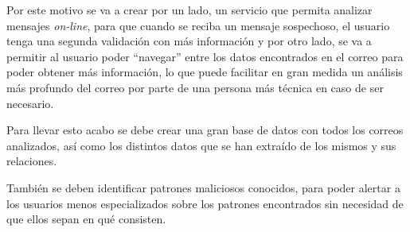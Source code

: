 Por este motivo se va a crear por un lado, un servicio que permita analizar mensajes \textit{on-line}, para que cuando se reciba un mensaje sospechoso, el usuario tenga una segunda validación con más información y por otro lado, se va a permitir al usuario poder “navegar” entre los datos encontrados en el correo para poder obtener más información, lo que puede facilitar en gran medida un análisis más profundo del correo por parte de una persona más técnica en caso de ser necesario.

Para llevar esto acabo se debe crear una gran base de datos con todos los correos analizados, así como los distintos datos que se han extraído de los mismos y sus relaciones. 

También se deben identificar patrones maliciosos conocidos, para poder alertar a los usuarios menos especializados sobre los patrones encontrados sin necesidad de que ellos sepan en qué consisten.


